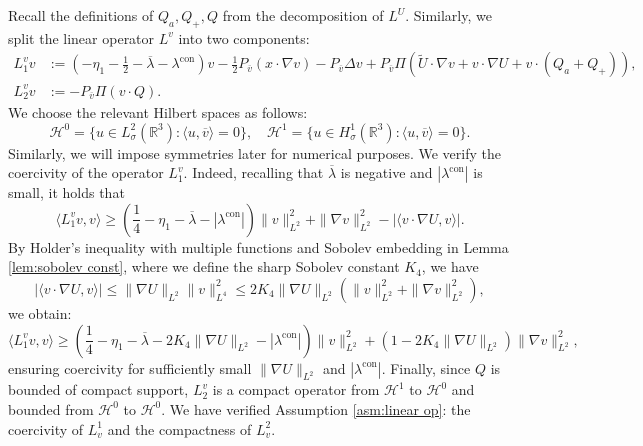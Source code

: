 \documentclass[11pt,a4paper]{article}
\numberwithin{equation}{section}
\newcommand{\assign}{:=}
\newcommand{\cdummy}{\cdot}
\begin{document}
Recall the definitions of $Q_a, Q_{+}, Q$ from the decomposition of $L^U$. Similarly, we split the linear operator $L^v$ into two components:
\begin{align}
  L_1^v v & \assign  ( - \eta_1 - \frac{1}{2} - \overline{\lambda} -
  \lambda^\text{con} ) v - \frac{1}{2} P_{\overline{v}} (x \cdot \nabla v) -
  P_{\overline{v}}\Delta v + P_{\overline{v}} \Pi (\widetilde{U} \cdot \nabla v + v \cdummy \nabla
  U + v \cdot (Q_a + Q_{+}) ), \nonumber\\
  L_2^v v & \assign  - P_{\overline{v}} \Pi (v \cdot Q) .  \label{eq:L2 def2}
\end{align}
We choose the relevant Hilbert spaces as follows:
\begin{equation}
\label{Def-H0H1-space}
 \mathcal{H}^0 = \{ u \in L^2_{\sigma} (\mathbb{R}^3) : \langle u,
   \overline{v} \rangle = 0 \},\quad \mathcal{H}^1 = \{ u \in H^1_{\sigma}
   (\mathbb{R}^3) : \langle u, \overline{v} \rangle = 0 \} . 
   \end{equation}
   Similarly, we will impose symmetries later for numerical purposes.
We verify the coercivity of the operator $L_1^v$. Indeed, recalling that $\overline{\lambda}$ is negative and $| \lambda^\text{con} |$ is small, it holds that
\[ \langle L_1^v v, v \rangle \geqslant ( \frac{1}{4} - \eta_1 -
   \overline{\lambda} - | \lambda^\text{con} | ) \| v \|_{L^2}^2 + \| \nabla v \|_{L^2}^2
   - | \langle v \cdummy \nabla U, v \rangle | . \]
By Holder's inequality with multiple functions and Sobolev embedding in Lemma \ref{lem:sobolev const}, where we define the sharp Sobolev constant $K_4$,
 we have
\begin{equation}
    | \langle v \cdummy \nabla U, v \rangle | \leqslant \| \nabla U \|_{L^2} \| v
   \|_{L^4}^2 \leqslant 2K_4 \| \nabla U \|_{L^2} (\| v \|_{L^2}^2 + \| \nabla v \|_{L^2}^2),\label{eq: cross term}
\end{equation}
we obtain:
\begin{equation}
    \langle L_1^v v, v \rangle \geqslant ( \frac{1}{4} - \eta_1 -
   \overline{\lambda} - 2K_4 \| \nabla U \|_{L^2} - | \lambda^\text{con} | ) \| v \|_{L^2}^2
   + (1 - 2K_4 \| \nabla U \|_{L^2}) \| \nabla v \|_{L^2}^2, \label{l1v c}
\end{equation} 
ensuring coercivity for sufficiently small $\| \nabla U \|_{L^2}$ and $| \lambda^\text{con}
|$. Finally, since $Q$ is bounded of compact support, $L_2^v$ is a compact operator from
$\mathcal{H}^1$ to $\mathcal{H}^0$ and bounded from $\mathcal{H}^0$ to $\mathcal{H}^0$. We have verified Assumption \ref{asm:linear
op}: the coercivity of $L_v^1$ and the compactness of $L_v^2$.
 
\end{document}
